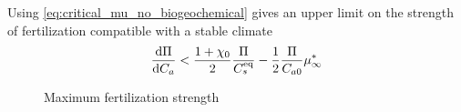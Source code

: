 Using \cref{eq:critical_mu_no_biogeochemical} gives an upper limit on the strength of  fertilization compatible with a stable climate
\begin{equation}
  \label{eq:maximum_co2_fertilization}
  \dv{\Pi}{C_a} < \frac{1+\chi_0}{2} \frac{\Pi}{C_s^{\mathrm{eq}}} - \frac{1}{2} \frac{\Pi}{C_{a0}} \mu_{\infty}^*
\end{equation}

\begin{figure}
  \centering
  \caption{Maximum  fertilization strength}
  \label{fig:maximum_co2_fertilization}
\end{figure}